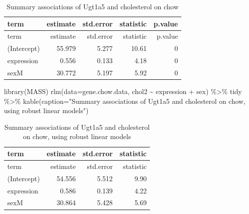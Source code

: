 \documentclass[
]{article}
\newenvironment{Shaded}{\begin{snugshade}}{\end{snugshade}}
\newcommand{\AttributeTok}[1]{\textcolor[rgb]{0.77,0.63,0.00}{#1}}
\newcommand{\FunctionTok}[1]{\textcolor[rgb]{0.00,0.00,0.00}{#1}}
\newcommand{\NormalTok}[1]{#1}
\newcommand{\SpecialCharTok}[1]{\textcolor[rgb]{0.00,0.00,0.00}{#1}}
\newcommand{\StringTok}[1]{\textcolor[rgb]{0.31,0.60,0.02}{#1}}
\begin{document}
\begin{longtable}[]{@{}lrrrr@{}}
\caption{Summary associations of Ugt1a5 and cholesterol on
chow}\tabularnewline
\toprule()
term & estimate & std.error & statistic & p.value \\
\midrule()
\endfirsthead
\toprule()
term & estimate & std.error & statistic & p.value \\
\midrule()
\endhead
(Intercept) & 55.979 & 5.277 & 10.61 & 0 \\
expression & 0.556 & 0.133 & 4.18 & 0 \\
sexM & 30.772 & 5.197 & 5.92 & 0 \\
\bottomrule()
\end{longtable}

\begin{Shaded}
\begin{Highlighting}[]
\FunctionTok{library}\NormalTok{(MASS)}
\FunctionTok{rlm}\NormalTok{(}\AttributeTok{data=}\NormalTok{gene.chow.data, chol2 }\SpecialCharTok{\textasciitilde{}}\NormalTok{ expression }\SpecialCharTok{+}\NormalTok{ sex) }\SpecialCharTok{\%\textgreater{}\%}
\NormalTok{  tidy }\SpecialCharTok{\%\textgreater{}\%}
  \FunctionTok{kable}\NormalTok{(}\AttributeTok{caption=}\StringTok{"Summary associations of Ugt1a5 and cholesterol on chow, using robust linear models"}\NormalTok{)}
\end{Highlighting}
\end{Shaded}

\begin{longtable}[]{@{}lrrr@{}}
\caption{Summary associations of Ugt1a5 and cholesterol on chow, using
robust linear models}\tabularnewline
\toprule()
term & estimate & std.error & statistic \\
\midrule()
\endfirsthead
\toprule()
term & estimate & std.error & statistic \\
\midrule()
\endhead
(Intercept) & 54.556 & 5.512 & 9.90 \\
expression & 0.586 & 0.139 & 4.22 \\
sexM & 30.864 & 5.428 & 5.69 \\
\bottomrule()
\end{longtable}
\end{document}
